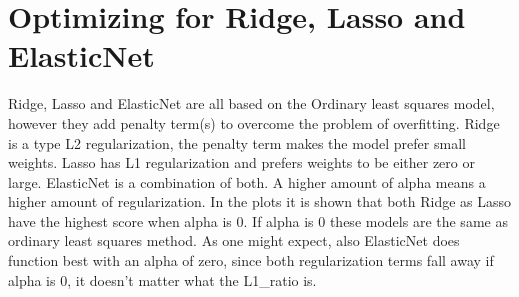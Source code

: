 \documentclass[11pt]{article}
\begin{document}
    \section{Optimizing for Ridge, Lasso and
ElasticNet}\label{optimizing-for-ridge-lasso-and-elasticnet}

Ridge, Lasso and ElasticNet are all based on the Ordinary least squares
model, however they add penalty term(s) to overcome the problem of
overfitting. Ridge is a type L2 regularization, the penalty term makes
the model prefer small weights. Lasso has L1 regularization and prefers
weights to be either zero or large. ElasticNet is a combination of both.
A higher amount of alpha means a higher amount of regularization. In the
plots it is shown that both Ridge as Lasso have the highest score when
alpha is 0. If alpha is 0 these models are the same as ordinary least
squares method. As one might expect, also ElasticNet does function best
with an alpha of zero, since both regularization terms fall away if
alpha is 0, it doesn't matter what the L1\_ratio is.
\end{document}
